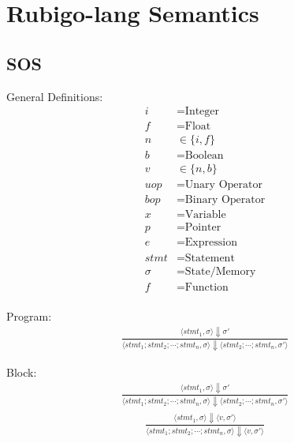 \documentclass[12pt]{article}
\begin{document}
    \section{Rubigo-lang Semantics}
    \subsection{SOS}
	General Definitions:
    	\begin{align*}
		i &= \text{Integer} \\
		f &= \text{Float} \\
		n &\in \{i, f\} \\
		b &= \text{Boolean} \\
		v &\in \{n, b\} \\
		uop &= \text{Unary Operator} \\
		bop &= \text{Binary Operator} \\
		x &= \text{Variable} \\
		p &= \text{Pointer} \\
		e &= \text{Expression} \\
		stmt &= \text{Statement} \\
		\sigma &= \text{State/Memory} \\
		f &= \text{Function} \\
	\end{align*}

	Program:
	\begin{align*}
		\frac{\langle stmt_1, \sigma \rangle\Downarrow \sigma'}
		{\langle stmt_1;stmt_2;\cdots;stmt_n, \sigma \rangle\Downarrow \langle stmt_2;\cdots;stmt_n, \sigma' \rangle}
	\end{align*}

	Block:
	\begin{align*}
		\frac{\langle stmt_1, \sigma \rangle\Downarrow \sigma'}
		{\langle stmt_1;stmt_2;\cdots;stmt_n, \sigma \rangle\Downarrow \langle stmt_2;\cdots;stmt_n, \sigma' \rangle}
	\end{align*}
	\begin{align*}
		\frac{\langle stmt_1, \sigma \rangle\Downarrow \langle v, \sigma' \rangle}
		{\langle stmt_1;stmt_2;\cdots;stmt_n, \sigma \rangle\Downarrow \langle v, \sigma' \rangle}
	\end{align*}

\end{document}
